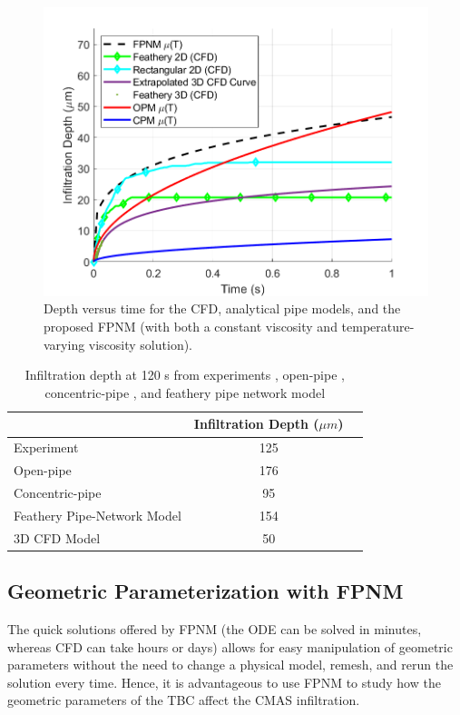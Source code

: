 \documentclass[%
 aip,
 amsmath,amssymb,
 reprint,%
]{revtex4-1}
\begin{document}
\begin{figure}[htp!]
    \centering
    \includegraphics[width=\linewidth]{Figures/analytical.png}
    \caption{Depth versus time for the CFD, analytical pipe models, and the proposed FPNM (with both a constant viscosity and temperature-varying viscosity solution).}
    \label{fig:pipeNetworkResults}
\end{figure}

\begin{table}[htp!]
\caption{\label{tab:resultsCompare} Infiltration depth at 120 s from experiments \cite{Naraparaju2019}, open-pipe \cite{Naraparaju2019}, concentric-pipe \cite{Naraparaju2019}, and feathery pipe network model}
\centering
\begin{ruledtabular}
\begin{tabular}{lcc}
 & Infiltration Depth ($\mu m$)\\
\hline
Experiment & 125\\
Open-pipe & 176\\
Concentric-pipe & 95\\
Feathery Pipe-Network Model & 154\\
3D CFD Model & 50
\end{tabular}
\end{ruledtabular}
\end{table}

\subsection{Geometric Parameterization with FPNM}

The quick solutions offered by FPNM (the ODE can be solved in minutes, whereas CFD can take hours or days) allows for easy manipulation of geometric parameters without the need to change a physical model, remesh, and rerun the solution every time. Hence, it is advantageous to use FPNM to study how the geometric parameters of the TBC affect the CMAS infiltration.
\end{document}
